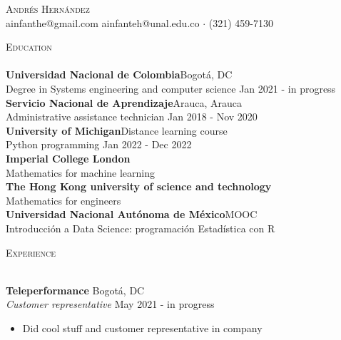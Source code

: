 \documentclass[a4paper]{article}
\newcommand{\lineunder} {
    \vspace*{-8pt} \\
    \hspace*{-18pt} \hrulefill \\
}
\newcommand{\header} [1] {
    {\hspace*{-18pt}\vspace*{6pt} \textsc{#1}}
    \vspace*{-6pt} \lineunder
}
\begin{document}
\vspace*{-40pt}

    

\vspace*{-10pt}
\begin{center}
	{\Huge \scshape {Andrés Hernández}}\\
	ainfanthe@gmail.com \textbar{} ainfanteh@unal.edu.co $\cdot$ (321) 459-7130\\
\end{center}

\header{Education}
\textbf{Universidad Nacional de Colombia}\hfill Bogotá, DC\\
Degree in Systems engineering and computer science \hfill Jan 2021 - in progress\\
\vspace{2mm}
\textbf{Servicio Nacional de Aprendizaje}\hfill Arauca, Arauca\\
Administrative assistance technician \hfill Jan 2018 - Nov 2020\\
\vspace{2mm}
\textbf{University of Michigan}\hfill Distance learning course\\
Python programming \hfill Jan 2022 - Dec 2022\\
\vspace{2mm}
\textbf{Imperial College London}\\
Mathematics for machine learning\\
\vspace{2mm}
\textbf{The Hong Kong university of science and technology}\\
Mathematics for engineers\\
\vspace{2mm}
\textbf{Universidad Nacional Autónoma de México}\hfill MOOC\\
Introducción a Data Science: programación Estadística con R\\
\vspace{2mm}

\header{Experience}
\vspace{1mm}

\textbf{Teleperformance} \hfill Bogotá, DC\\
\textit{Customer representative} \hfill May 2021 - in progress\\
\vspace{-1mm}
\begin{itemize} \itemsep 1pt
	\item Did cool stuff and customer representative in company
\end{itemize}
\end{document}
